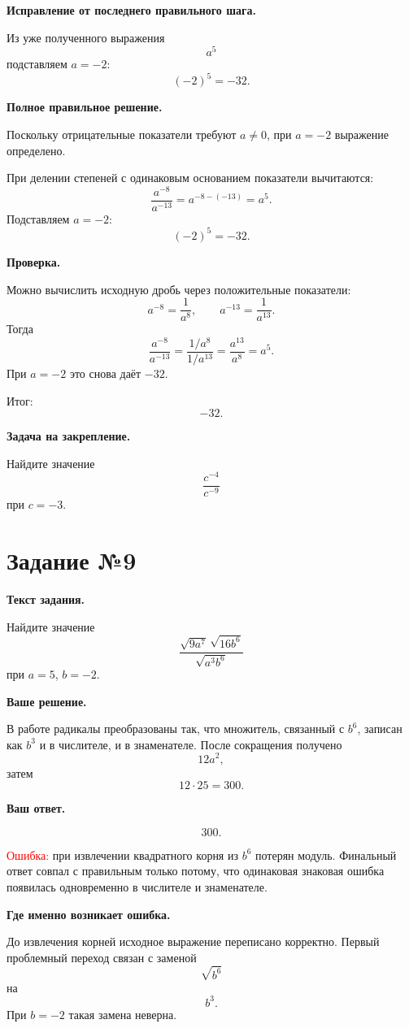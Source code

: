 \documentclass[12pt,a4paper]{article}
\begin{document}
\textbf{Исправление от последнего правильного шага.}

Из уже полученного выражения
\[
a^5
\]
подставляем $a=-2$:
\[
(-2)^5=-32.
\]

\textbf{Полное правильное решение.}

Поскольку отрицательные показатели требуют $a\ne0$, при $a=-2$ выражение определено.

При делении степеней с одинаковым основанием показатели вычитаются:
\[
\frac{a^{-8}}{a^{-13}}
=
a^{-8-(-13)}
=
a^5.
\]
Подставляем $a=-2$:
\[
(-2)^5=-32.
\]

\textbf{Проверка.}

Можно вычислить исходную дробь через положительные показатели:
\[
a^{-8}=\frac1{a^8},
\qquad
a^{-13}=\frac1{a^{13}}.
\]
Тогда
\[
\frac{a^{-8}}{a^{-13}}
=
\frac{1/a^8}{1/a^{13}}
=
\frac{a^{13}}{a^8}
=
a^5.
\]
При $a=-2$ это снова даёт $-32$.

\textcolor{teal!60!black}{Итог:}
\[
\boxed{-32}.
\]

\textbf{Задача на закрепление.}

Найдите значение
\[
\frac{c^{-4}}{c^{-9}}
\]
при $c=-3$.

\newpage
{}
\label{task:9}
\section*{Задание №9}

\textbf{Текст задания.}

Найдите значение
\[
\frac{\sqrt{9a^7}\,\sqrt{16b^6}}{\sqrt{a^3b^6}}
\]
при $a=5$, $b=-2$.

\textbf{Ваше решение.}

В работе радикалы преобразованы так, что множитель, связанный с $b^6$, записан как $b^3$ и в числителе, и в знаменателе. После сокращения получено
\[
12a^2,
\]
затем
\[
12\cdot25=300.
\]

\textbf{Ваш ответ.}

\[
300.
\]

\textcolor{red}{Ошибка:} при извлечении квадратного корня из $b^6$ потерян модуль. Финальный ответ совпал с правильным только потому, что одинаковая знаковая ошибка появилась одновременно в числителе и знаменателе.

\textbf{Где именно возникает ошибка.}

До извлечения корней исходное выражение переписано корректно. Первый проблемный переход связан с заменой
\[
\sqrt{b^6}
\]
на
\[
b^3.
\]
При $b=-2$ такая замена неверна.
\end{document}
